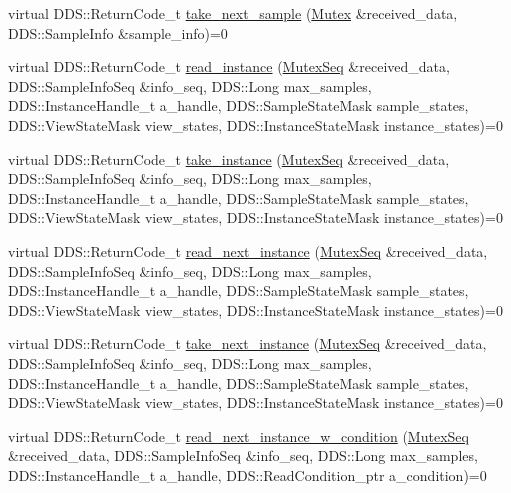 \begin{DoxyCompactItemize}
\item 
virtual DDS::ReturnCode\_\-t \hyperlink{classKnowledge_1_1MutexDataReaderView_abc859e968b2707fc78be5f0c530db511}{take\_\-next\_\-sample} (\hyperlink{structKnowledge_1_1Mutex}{Mutex} \&received\_\-data, DDS::SampleInfo \&sample\_\-info)=0
\item 
virtual DDS::ReturnCode\_\-t \hyperlink{classKnowledge_1_1MutexDataReaderView_ac5e9aaab2d50448a2ee5e5c2ef5e3188}{read\_\-instance} (\hyperlink{namespaceKnowledge_a3165529aa87299c6a92754fbd7eeeff4}{MutexSeq} \&received\_\-data, DDS::SampleInfoSeq \&info\_\-seq, DDS::Long max\_\-samples, DDS::InstanceHandle\_\-t a\_\-handle, DDS::SampleStateMask sample\_\-states, DDS::ViewStateMask view\_\-states, DDS::InstanceStateMask instance\_\-states)=0
\item 
virtual DDS::ReturnCode\_\-t \hyperlink{classKnowledge_1_1MutexDataReaderView_a83f4b137ae772474c1fa5146de9ad0c8}{take\_\-instance} (\hyperlink{namespaceKnowledge_a3165529aa87299c6a92754fbd7eeeff4}{MutexSeq} \&received\_\-data, DDS::SampleInfoSeq \&info\_\-seq, DDS::Long max\_\-samples, DDS::InstanceHandle\_\-t a\_\-handle, DDS::SampleStateMask sample\_\-states, DDS::ViewStateMask view\_\-states, DDS::InstanceStateMask instance\_\-states)=0
\item 
virtual DDS::ReturnCode\_\-t \hyperlink{classKnowledge_1_1MutexDataReaderView_a86f7da40f5dd238bd7563583c3775358}{read\_\-next\_\-instance} (\hyperlink{namespaceKnowledge_a3165529aa87299c6a92754fbd7eeeff4}{MutexSeq} \&received\_\-data, DDS::SampleInfoSeq \&info\_\-seq, DDS::Long max\_\-samples, DDS::InstanceHandle\_\-t a\_\-handle, DDS::SampleStateMask sample\_\-states, DDS::ViewStateMask view\_\-states, DDS::InstanceStateMask instance\_\-states)=0
\item 
virtual DDS::ReturnCode\_\-t \hyperlink{classKnowledge_1_1MutexDataReaderView_ace1e95e5fd64380943add90a846b73f2}{take\_\-next\_\-instance} (\hyperlink{namespaceKnowledge_a3165529aa87299c6a92754fbd7eeeff4}{MutexSeq} \&received\_\-data, DDS::SampleInfoSeq \&info\_\-seq, DDS::Long max\_\-samples, DDS::InstanceHandle\_\-t a\_\-handle, DDS::SampleStateMask sample\_\-states, DDS::ViewStateMask view\_\-states, DDS::InstanceStateMask instance\_\-states)=0
\item 
virtual DDS::ReturnCode\_\-t \hyperlink{classKnowledge_1_1MutexDataReaderView_a5d9ca32089c731fffe4fd29c19137a77}{read\_\-next\_\-instance\_\-w\_\-condition} (\hyperlink{namespaceKnowledge_a3165529aa87299c6a92754fbd7eeeff4}{MutexSeq} \&received\_\-data, DDS::SampleInfoSeq \&info\_\-seq, DDS::Long max\_\-samples, DDS::InstanceHandle\_\-t a\_\-handle, DDS::ReadCondition\_\-ptr a\_\-condition)=0

\end{DoxyCompactItemize}
